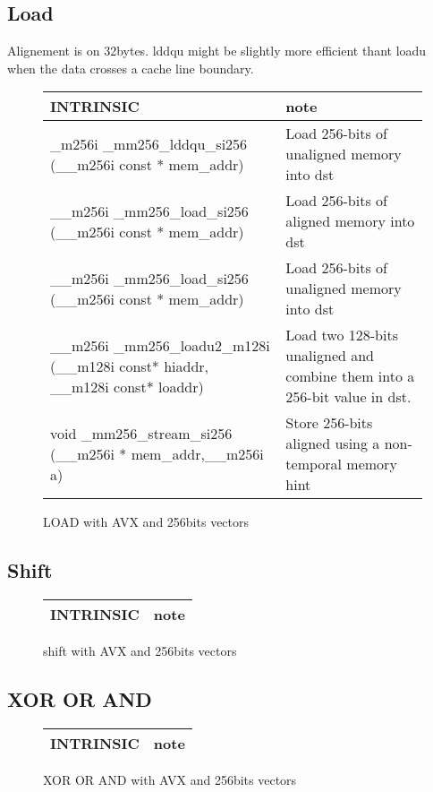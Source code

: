 \documentclass{article}
\begin{document}
\subsection{Load}
Alignement is on 32bytes.  lddqu might be slightly more efficient thant loadu when the data crosses a cache line boundary.
\vspace{1cm}
\begin{figure}[h!]
\noindent
\noindent\begin{tabular}{|l|l|}
  \hline
  INTRINSIC & note \\
  \hline
\_m256i \_mm256\_lddqu\_si256 (\_\_m256i const * mem\_addr) & Load 256-bits of unaligned memory into dst \\
\hline
 \_\_m256i \_mm256\_load\_si256 (\_\_m256i const * mem\_addr) & Load 256-bits of aligned memory into dst \\
 \hline
  \_\_m256i \_mm256\_load\_si256 (\_\_m256i const * mem\_addr) & Load 256-bits of unaligned memory into dst \\
  \hline
  \_\_m256i \_mm256\_loadu2\_m128i (\_\_m128i const* hiaddr, \_\_m128i const* loaddr) & Load two 128-bits unaligned and combine them into a 256-bit value in dst. \\
  \hline
  void \_mm256\_stream\_si256 (\_\_m256i * mem\_addr,\_\_m256i a) & Store 256-bits aligned using a non-temporal memory hint \\
  \hline
\end{tabular}
\caption{LOAD with AVX and 256bits vectors}
\label{fig:load AVX 256bits instructions}
\end{figure}


\newpage
\subsection{Shift}
\vspace{1cm}
\begin{figure}[h!]
\noindent
\noindent\begin{tabular}{|l|l|}
  \hline
  INTRINSIC & note \\
  \hline
  
  
    \hline
\end{tabular}
\caption{shift with AVX and 256bits vectors}
\label{fig:shift AVX 256bits instructions}
\end{figure}

\subsection{XOR OR AND}
\vspace{1cm}
\begin{figure}[h!]
\noindent
\noindent\begin{tabular}{|l|l|}
  \hline
  INTRINSIC & note \\
  \hline
\end{tabular}
\caption{XOR OR AND with AVX and 256bits vectors}
\label{fig:XOR OR AND AVX 256bits instructions}
\end{figure}
\end{document}

